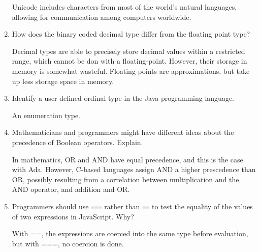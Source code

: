 \begin{enumerate}
  \begin{answer}

   Unicode includes characters from most of the world's natural languages, allowing for communication among computers worldwide.

    \end{answer}

  \item How does the binary coded decimal type differ from the
    floating point type?

  \begin{answer}

    Decimal types are able to precisely store decimal values within a restricted range, which cannot be don with a floating-point. However, their storage in memory is somewhat wasteful. Floating-points are approximations, but take up less storage space in memory.

    \end{answer}

  \item Identify a user-defined ordinal type in the Java programming
    language.

  \begin{answer}

    An enumeration type.

    \end{answer}

  \item Mathematicians and programmers might have different ideas
    about the precedence of Boolean operators. Explain.

  \begin{answer}

    In mathematics, OR and AND have equal precedence, and this is the case with Ada. However, C-based languages assign AND a higher prescedence than OR, possibly resulting from a correlation between multiplication and the AND operator, and addition and OR.

    \end{answer}

  \item Programmers should use \verb+===+ rather than \verb+==+ to
    test the equality of the values of two expressions in JavaScript. Why?

  \begin{answer}

    With ==, the expressions are coerced into the same type before evaluation, but with ===, no coercion is done.


\end{answer}
\end{enumerate}
